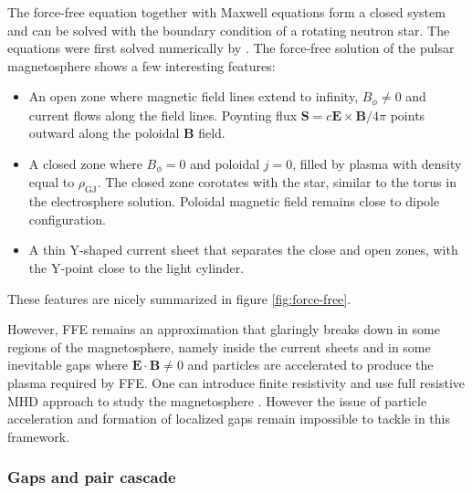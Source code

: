 The force-free equation together with Maxwell equations form a closed system
and can be solved with the boundary condition of a rotating neutron star. The
equations were first solved numerically by \citet{contopoulos_axisymmetric_1999}
\citetext{see also e.g.\ \citealp{goodwin_idealized_2004};
  \citealp{gruzinov_power_2005}; \citealp{timokhin_force-free_2006};
  \citealp{parfrey_introducing_2012}}. The force-free solution of the pulsar
magnetosphere shows a few interesting features:
\begin{itemize}
\item An open zone where magnetic field lines extend to infinity, $B_{\phi}\neq
  0$ and current flows along the field lines. Poynting flux $\mathbf{S} =
  c\mathbf{E}\times \mathbf{B}/4\pi$ points outward along the poloidal $\mathbf{B}$
  field.
\item A closed zone where $B_{\phi} = 0$ and poloidal $j=0$, filled by plasma
  with density equal to $\rho_\mathrm{GJ}$. The closed zone corotates with the
  star, similar to the torus in the electrosphere solution. Poloidal magnetic
  field remains close to dipole configuration.
\item A thin Y-shaped current sheet that separates the close and open zones,
  with the Y-point close to the light cylinder.
\end{itemize}
These features are nicely summarized in figure \ref{fig:force-free}.


However, FFE remains an approximation that glaringly breaks down in some regions
of the magnetosphere, namely inside the current sheets and in some inevitable
gaps where $\mathbf{E}\cdot \mathbf{B} \neq 0$ and particles are accelerated to
produce the plasma required by FFE. One can introduce finite resistivity and use
full resistive MHD approach to study the magnetosphere
\citep[e.g.][]{kalapotharakos_gamma-ray_2014}%
. However the issue of particle acceleration and formation of localized gaps
remain impossible to tackle in this framework.

\subsubsection{Gaps and pair cascade}
\label{sec:gap-models}


